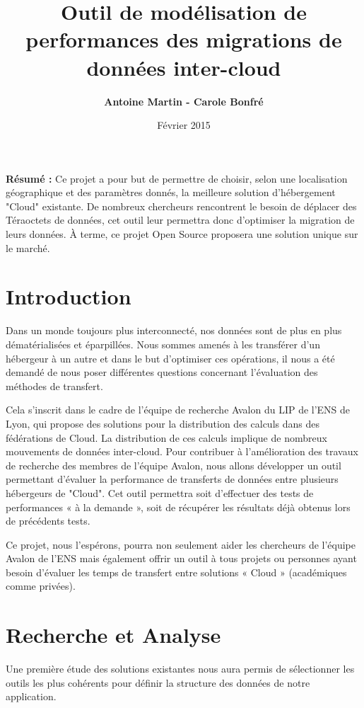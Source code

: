 \documentclass[10pt]{article}
\title{\Huge{Outil de modélisation de performances des migrations de données inter-cloud}}
\author{\textbf{Antoine Martin - Carole Bonfré} }
\date{Février 2015}
\begin{document}
\maketitle

\textbf{Résumé : } Ce projet a pour but de permettre de choisir, selon
une localisation géographique et des paramètres donnés, la meilleure
solution d'hébergement "Cloud" existante. De nombreux chercheurs
rencontrent le besoin de déplacer des Téraoctets de données, cet outil
leur permettra donc d'optimiser la migration de leurs données. À
terme, ce projet Open Source proposera une solution unique sur le
marché.

\section{Introduction}

Dans un monde toujours plus interconnecté, nos données sont de plus en
plus dématérialisées et éparpillées. Nous sommes amenés à les
transférer d’un hébergeur à un autre et dans le but d’optimiser ces
opérations, il nous a été demandé de nous poser différentes questions
concernant l’évaluation des méthodes de transfert.

Cela s’inscrit dans le cadre de l’équipe de recherche Avalon du LIP de
l’ENS de Lyon, qui propose des solutions pour la distribution des
calculs dans des fédérations de Cloud. La distribution de ces calculs
implique de nombreux mouvements de données inter-cloud. Pour
contribuer à l’amélioration des travaux de recherche des membres de
l’équipe Avalon, nous allons développer un outil permettant d’évaluer
la performance de transferts de données entre plusieurs hébergeurs de
"Cloud". Cet outil permettra soit d’effectuer des tests de
performances « à la demande », soit de récupérer les résultats déjà
obtenus lors de précédents tests.

Ce projet, nous l’espérons, pourra non seulement aider les chercheurs
de l’équipe Avalon de l’ENS mais également offrir un outil à tous
projets ou personnes ayant besoin d’évaluer les temps de transfert
entre solutions « Cloud » (académiques comme privées).

\section{Recherche et Analyse}
Une première étude des solutions existantes nous aura permis de
sélectionner les outils les plus cohérents pour définir la structure
des données de notre application.
\end{document}
